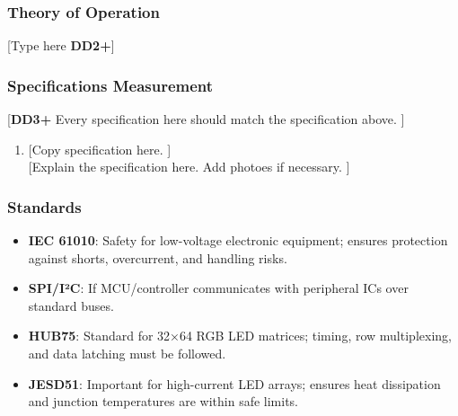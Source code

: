\subsubsection{Theory of Operation}
[Type here \textbf{DD2+}]

\subsubsection{Specifications Measurement}
[\textbf{DD3+} Every specification here should match the specification above. ]
\begin{enumerate}
    \item {[Copy specification here. ]} \\
          {[Explain the specification here. Add photoes if necessary. ]}
\end{enumerate}

\subsubsection{Standards}
\begin{itemize}
    \item \textbf{IEC 61010}: Safety for low-voltage electronic equipment; ensures protection against shorts, overcurrent, and handling risks.
    \item \textbf{SPI/I²C}: If MCU/controller communicates with peripheral ICs over standard buses.
    \item \textbf{HUB75}: Standard for 32×64 RGB LED matrices; timing, row multiplexing, and data latching must be followed.
    \item \textbf{JESD51}: Important for high-current LED arrays; ensures heat dissipation and junction temperatures are within safe limits.
\end{itemize}